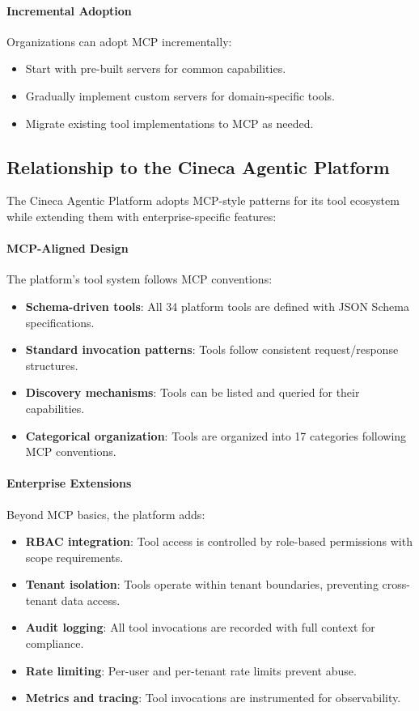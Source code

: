\documentclass[a4paper,twoside]{sapthesis}
\begin{document}
\paragraph{Incremental Adoption}

Organizations can adopt MCP incrementally:
\begin{itemize}
    \item Start with pre-built servers for common capabilities.
    \item Gradually implement custom servers for domain-specific tools.
    \item Migrate existing tool implementations to MCP as needed.
\end{itemize}

\subsection{Relationship to the Cineca Agentic Platform}

The Cineca Agentic Platform adopts MCP-style patterns for its tool ecosystem while extending them with enterprise-specific features:

\paragraph{MCP-Aligned Design}

The platform's tool system follows MCP conventions:
\begin{itemize}
    \item \textbf{Schema-driven tools}: All 34 platform tools are defined with JSON Schema specifications.
    \item \textbf{Standard invocation patterns}: Tools follow consistent request/response structures.
    \item \textbf{Discovery mechanisms}: Tools can be listed and queried for their capabilities.
    \item \textbf{Categorical organization}: Tools are organized into 17 categories following MCP conventions.
\end{itemize}

\paragraph{Enterprise Extensions}

Beyond MCP basics, the platform adds:
\begin{itemize}
    \item \textbf{RBAC integration}: Tool access is controlled by role-based permissions with scope requirements.
    \item \textbf{Tenant isolation}: Tools operate within tenant boundaries, preventing cross-tenant data access.
    \item \textbf{Audit logging}: All tool invocations are recorded with full context for compliance.
    \item \textbf{Rate limiting}: Per-user and per-tenant rate limits prevent abuse.
    \item \textbf{Metrics and tracing}: Tool invocations are instrumented for observability.
\end{itemize}
\end{document}
